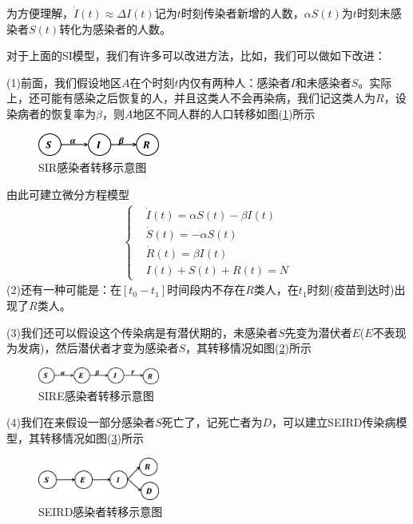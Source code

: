		为方便理解，$\dot{I}(t) \approx \Delta I(t)$记为$t$时刻传染者新增的人数，$\alpha S(t)$为$t$时刻未感染者$S(t)$转化为感染者的人数。
		\par
		对于上面的SI模型，我们有许多可以改进方法，比如，我们可以做如下改进：
		\par
		(1)前面，我们假设地区$A$在个时刻$t$内仅有两种人：感染者$I$和未感染者$S$。实际上，还可能有感染之后恢复的人，并且这类人不会再染病，我们记这类人为$R$，设染病者的恢复率为$\beta$，则$A$地区不同人群的人口转移如图(\ref{fig:SIR感染者转移示意图})所示
		\begin{figure}[H]
		\centering
		\includegraphics[width=4cm]{images/SIR_Infection_transfer.jpg}
		\caption{SIR感染者转移示意图}
		\label{fig:SIR感染者转移示意图}
		\end{figure}
		由此可建立微分方程模型
		\begin{align*}
			 \left\{
				 \begin{aligned}
					 &\dot{I}(t) = \alpha S(t)- \beta I(t)\\
					 &\dot{S}(t) = - \alpha S(t)\\
					 &\dot{R}(t) = \beta I(t)\\
					 &I(t) + S(t) + R(t) = N
				 \end{aligned}
			 \right.
		\end{align*}
		(2)还有一种可能是：在$[t_0-t_1]$时间段内不存在$R$类人，在$t_1$时刻(疫苗到达时)出现了$R$类人。
		\par
		(3)我们还可以假设这个传染病是有潜伏期的，未感染者$S$先变为潜伏者$E$($E$不表现为发病)，然后潜伏者才变为感染者$S$，其转移情况如图(\ref{fig:SIRE感染者转移示意图})所示
		\begin{figure}[H]
		\centering
		\includegraphics[width=4cm]{images/SIRE_Infection_transfer.jpg}
		\caption{SIRE感染者转移示意图}
		\label{fig:SIRE感染者转移示意图}
		\end{figure}
		(4)我们在来假设一部分感染者$S$死亡了，记死亡者为$D$，可以建立SEIRD传染病模型，其转移情况如图(\ref{fig:SEIRD感染者转移示意图})所示
		\begin{figure}[H]
		\centering
		\includegraphics[width=4cm]{images/SEIRD_Infection_transfer.jpg}
		\caption{SEIRD感染者转移示意图}
		\label{fig:SEIRD感染者转移示意图}
		\end{figure}
